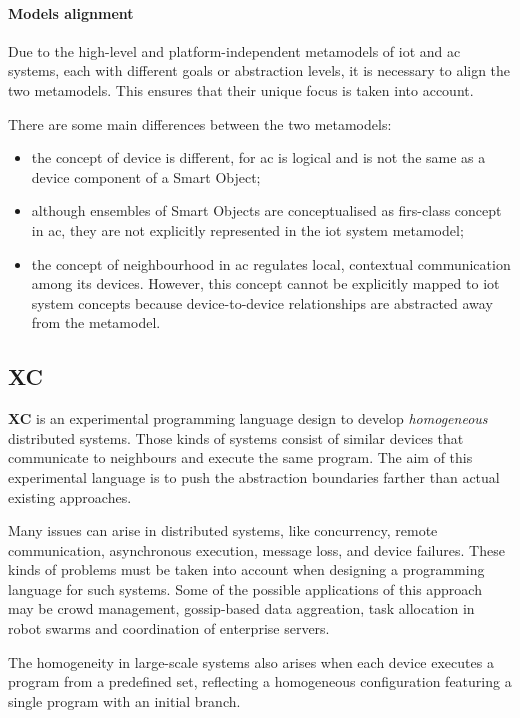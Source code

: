 \paragraph{Models alignment}
Due to the high-level and platform-independent metamodels of \ac{iot} and \ac{ac} systems, each with different goals or
abstraction levels, it is necessary to align the two metamodels.
This ensures that their unique focus is taken into account.

There are some main differences between the two metamodels:
\begin{itemize}
    \item the concept of device is different, for \ac{ac} is logical and is not the same as a device component of a Smart Object;
    \item although ensembles of Smart Objects are conceptualised as firs-class concept in \ac{ac}, they are not explicitly
        represented in the \ac{iot} system metamodel;
    \item the concept of neighbourhood in \ac{ac} regulates local, contextual communication among its devices.
        However, this concept cannot be explicitly mapped to \ac{iot} system concepts because device-to-device relationships
        are abstracted away from the metamodel.
\end{itemize}

\subsection{XC}
\label{subsec:xc}
\textbf{XC} is an experimental programming language design to develop \emph{homogeneous} distributed systems.
Those kinds of systems consist of similar devices that communicate to neighbours and execute the same program.
The aim of this experimental language is to push the abstraction boundaries farther than actual existing approaches.

Many issues can arise in distributed systems, like concurrency, remote communication, asynchronous execution, message
loss, and device failures.
These kinds of problems must be taken into account when designing a programming language for such systems.
Some of the possible applications of this approach may be crowd management, gossip-based data aggreation, task allocation
in robot swarms and coordination of enterprise servers. %

The homogeneity in large-scale systems also arises when each device executes a program from a predefined set, reflecting
a homogeneous configuration featuring a single program with an initial branch.

